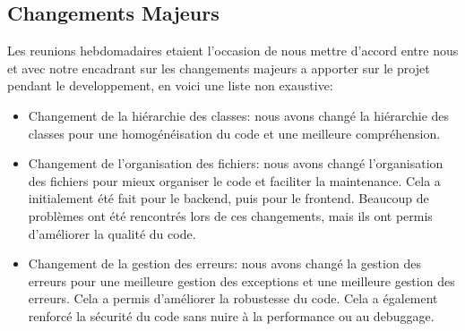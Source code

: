 \subsection{Changements Majeurs}

Les reunions hebdomadaires etaient l'occasion de nous mettre d'accord entre nous et avec notre encadrant sur
les changements majeurs a apporter sur le projet pendant le developpement, en voici une liste non exaustive:

\begin{itemize}
    \item Changement de la hiérarchie des classes: nous avons changé la hiérarchie des classes pour
    une homogénéisation du code et une meilleure compréhension.
    \item Changement de l'organisation des fichiers: nous avons changé l'organisation des fichiers pour
    mieux organiser le code et faciliter la maintenance. Cela a initialement été fait pour le backend, puis
    pour le frontend. Beaucoup de problèmes ont été rencontrés lors de ces changements, mais ils ont permis
    d'améliorer la qualité du code.
    \item Changement de la gestion des erreurs: nous avons changé la gestion des erreurs pour une meilleure
    gestion des exceptions et une meilleure gestion des erreurs. Cela a permis d'améliorer la robustesse du code.
    Cela a également renforcé la sécurité du code sans nuire à la performance ou au debuggage.
\end{itemize}

